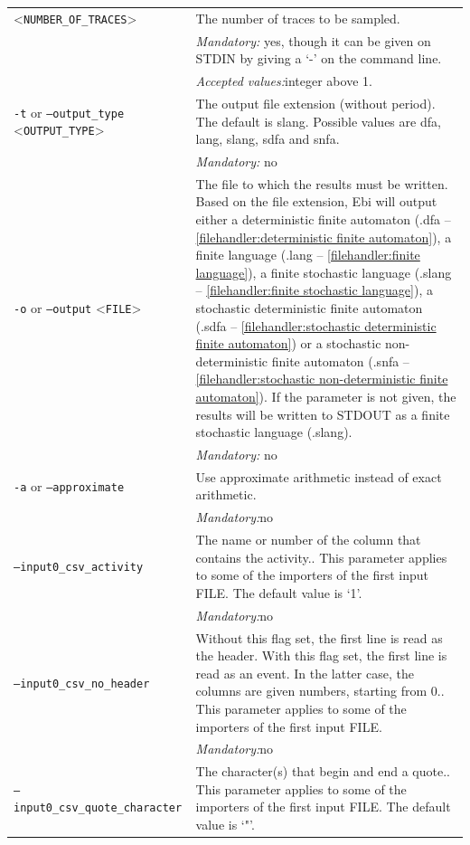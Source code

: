 {\begin{tabularx}{\linewidth}{lX}
<\texttt{NUMBER\_OF\_TRACES}>&The number of traces to be sampled.\\
&\textit{Mandatory:} \quad yes, though it can be given on STDIN by giving a `-' on the command line.\\
&\textit{Accepted values:}\quad integer above 1.\\
\texttt{-t} or \texttt{--output\_type} <\texttt{OUTPUT\_TYPE}> &
The output file extension (without period). The default is slang. Possible values are dfa, lang, slang, sdfa and snfa.\\
&\textit{Mandatory:} \quad no\\
\texttt{-o} or \texttt{--output} <\texttt{FILE}> &
The file to which the results must be written. Based on the file extension, Ebi will output either a deterministic finite automaton (.dfa -- \cref{filehandler:deterministic finite automaton}), a finite language (.lang -- \cref{filehandler:finite language}), a finite stochastic language (.slang -- \cref{filehandler:finite stochastic language}), a stochastic deterministic finite automaton (.sdfa -- \cref{filehandler:stochastic deterministic finite automaton}) or a stochastic non-deterministic finite automaton (.snfa -- \cref{filehandler:stochastic non-deterministic finite automaton}).
If the parameter is not given, the results will be written to STDOUT as a finite stochastic language (.slang).\\
&\textit{Mandatory:} \quad no\\
\texttt{-a} or \texttt{--approximate} & Use approximate arithmetic instead of exact arithmetic.\\
&\textit{Mandatory:}\quad no\\
\texttt{--input0\_csv\_activity} & The name or number of the column that contains the activity.. This parameter applies to some of the importers of the first input FILE. The default value is `1'.\\
&\textit{Mandatory:}\quad no\\
\texttt{--input0\_csv\_no\_header} & Without this flag set, the first line is read as the header. 
    With this flag set, the first line is read as an event. In the latter case, the columns are given numbers, starting from 0.. This parameter applies to some of the importers of the first input FILE. \\
&\textit{Mandatory:}\quad no\\
\texttt{--input0\_csv\_quote\_character} & The character(s) that begin and end a quote.. This parameter applies to some of the importers of the first input FILE. The default value is `"'.\\

\end{tabularx}}
